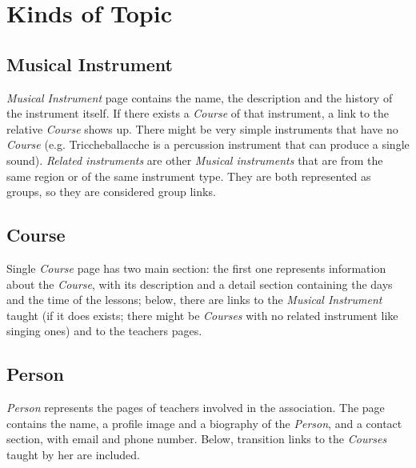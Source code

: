 \documentclass[../../DD.tex]{subfiles}
\begin{document}
\newpage
\section{Kinds of Topic}
	\subsection{Musical Instrument}
		\textit{Musical Instrument} page contains the name, the description and the history of the instrument itself. If there exists a \textit{Course} of that instrument, a link to the relative \textit{Course} shows up. There might be very simple instruments that have no \textit{Course} (e.g. Triccheballacche is a percussion instrument that can produce a single sound). \textit{Related instruments} are other \textit{Musical instruments} that are from the same region or of the same instrument type. They are both represented as groups, so they are considered group links.
		\newline

	\newpage
	\subsection{Course}
		Single \textit{Course} page has two main section: the first one represents information about the \textit{Course}, with its description and a detail section containing the days and the time of the lessons; below, there are links to the \textit{Musical Instrument} taught (if it does exists; there might be \textit{Courses} with no related instrument like singing ones) and to the teachers pages.  
		\newline

	\newpage
	\subsection{Person}
		\textit{Person} represents the pages of teachers involved in the association. The page contains the name, a profile image and a biography of the \textit{Person}, and a contact section, with email and phone number. Below, transition links to the \textit{Courses} taught by her are included.
		\newline
\end{document}
